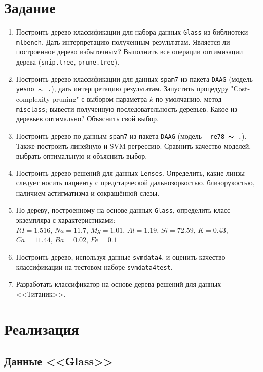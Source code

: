 \documentclass[a4paper,12pt]{article} %
\begin{document}


\section{Задание}

\begin{enumerate}[noitemsep]
    \item Построить дерево классификации для набора данных \texttt{Glass} из библиотеки \texttt{mlbench}.
    Дать интерпретацию полученным результатам.
    Является ли построенное дерево избыточным?
    Выполнить все операции оптимизации дерева (\texttt{snip.tree}, \texttt{prune.tree}).
    \item Построить дерево классификации для данных \texttt{spam7} из пакета \texttt{DAAG} (модель -- \texttt{yesno $\thicksim$ .}), дать интерпретацию результатам.
    Запустить процедуру "Cost-complexity pruning"\hspace{0pt} с выбором параметра $ k $ по умолчанию, метод -- \texttt{misclass}; вывести полученную последовательность деревьев.
    Какое из деревьев оптимально? Объяснить свой выбор.
    \item Построить дерево по данным \texttt{spam7} из пакета \texttt{DAAG} (модель -- \texttt{re78 $\thicksim$ .}). Также построить линейную и SVM-регрессию. Сравнить качество моделей, выбрать оптимальную и объяснить выбор.
    \item Построить дерево решений для данных \texttt{Lenses}.
    Определить, какие линзы следует носить пациенту с предстарческой дальнозоркостью, близорукостью, наличием астигматизма и сокращённой слезы.
    \item По дереву, построенному на основе данных \texttt{Glass}, определить класс экземпляра с характеристиками: \\
    $RI=1.516$, $Na=11.7$, $Mg=1.01$, $Al=1.19$, $Si=72.59$, $K=0.43$, $Ca=11.44$, $Ba=0.02$, $Fe=0.1$
    \item Построить дерево, используя данные \texttt{svmdata4}, и оценить качество классификации на тестовом наборе \texttt{svmdata4test}.
    \item Разработать классификатор на основе дерева решений для данных <<Титаник>>.
\end{enumerate}

\newpage
\section{Реализация}
\subsection{Данные <<Glass>>}
\end{document}
